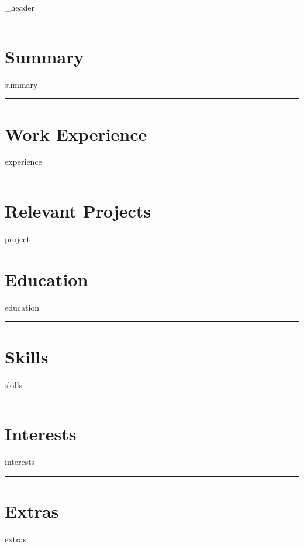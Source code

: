 \documentclass[letter,10pt]{article}
\author{Guilherme Lopes}
\begin{document}
{_header}
\vspace*{10pt}
\hrule

\section{\textbf{Summary}}
{summary}
\vspace*{6pt}
\hrule

\section{\textbf{Work Experience}}
{experience}
\vspace*{6pt}
\hrule

\section{\textbf{Relevant Projects}}
\vspace*{3pt}
{project}
\vspace*{6pt}

\section{\textbf{Education}}
\vspace*{3pt}
{education}
\hrule
\vspace*{12pt}

\section{\textbf{Skills}}
\vspace*{3pt}
{skills}
\vspace*{6pt}
\hrule

\section{\textbf{Interests}}
\vspace*{3pt}
{interests}
\vspace*{12pt}
\hrule

\section{\textbf{Extras}}
\vspace*{3pt}
{extras}
\vspace*{6pt}
\end{document}
